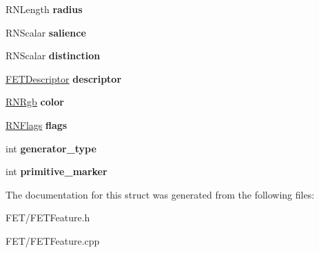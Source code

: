 \begin{DoxyCompactItemize}
\item 
R\+N\+Length {\bfseries radius}\hypertarget{struct_f_e_t_feature_ab567850107719808e77c0e38e59c4076}{}\label{struct_f_e_t_feature_ab567850107719808e77c0e38e59c4076}

\item 
R\+N\+Scalar {\bfseries salience}\hypertarget{struct_f_e_t_feature_aa7fb8fbaa190e6ee40f4bd53907d027f}{}\label{struct_f_e_t_feature_aa7fb8fbaa190e6ee40f4bd53907d027f}

\item 
R\+N\+Scalar {\bfseries distinction}\hypertarget{struct_f_e_t_feature_acf6db4b7918e3cffc027f9d3ea387c8b}{}\label{struct_f_e_t_feature_acf6db4b7918e3cffc027f9d3ea387c8b}

\item 
\hyperlink{struct_f_e_t_descriptor}{F\+E\+T\+Descriptor} {\bfseries descriptor}\hypertarget{struct_f_e_t_feature_a4fa677c8d951ac9527edea24f7d12274}{}\label{struct_f_e_t_feature_a4fa677c8d951ac9527edea24f7d12274}

\item 
\hyperlink{class_r_n_rgb}{R\+N\+Rgb} {\bfseries color}\hypertarget{struct_f_e_t_feature_acee2aad7fb93f340e9312c4bda8bdb1b}{}\label{struct_f_e_t_feature_acee2aad7fb93f340e9312c4bda8bdb1b}

\item 
\hyperlink{class_r_n_flags}{R\+N\+Flags} {\bfseries flags}\hypertarget{struct_f_e_t_feature_a43ae0504a6cea379db9fa20cb207750e}{}\label{struct_f_e_t_feature_a43ae0504a6cea379db9fa20cb207750e}

\item 
int {\bfseries generator\+\_\+type}\hypertarget{struct_f_e_t_feature_a7ff63762d6ce6e496b9539b536479cc6}{}\label{struct_f_e_t_feature_a7ff63762d6ce6e496b9539b536479cc6}

\item 
int {\bfseries primitive\+\_\+marker}\hypertarget{struct_f_e_t_feature_a7c18b8b19460a366b76ae7b3f941c863}{}\label{struct_f_e_t_feature_a7c18b8b19460a366b76ae7b3f941c863}

\end{DoxyCompactItemize}


The documentation for this struct was generated from the following files\+:\begin{DoxyCompactItemize}
\item 
F\+E\+T/F\+E\+T\+Feature.\+h\item 
F\+E\+T/F\+E\+T\+Feature.\+cpp\end{DoxyCompactItemize}
